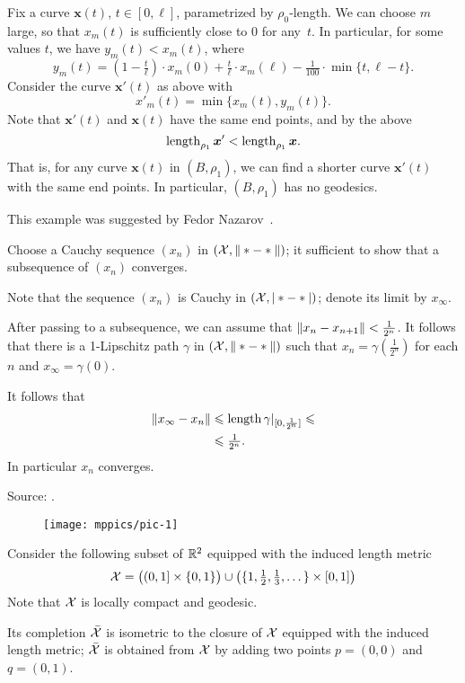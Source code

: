 Fix a curve $\bm{x}(t)$, $t\in[0,\ell]$, parametrized by  $\rho_0$-length.
We can choose $m$ large, so that $x_m(t)$ is sufficiently close to $0$ for any~$t$.
In particular, for some values $t$, we have $y_m(t)<x_m(t)$, where
\[y_m(t)=(1-\tfrac t\ell)\cdot x_m(0)
+\tfrac t\ell\cdot x_m(\ell)
-\tfrac 1{100}\cdot \min\{t,\ell-t\}.\]
Consider the curve $\bm{x}'(t)$ as above with
\[x'_m(t)=\min\{x_m(t),y_m(t)\}.\]
Note that $\bm{x}'(t)$ and $\bm{x}(t)$ have the same end points, and by the above
\[\mathop{\rm length}\nolimits_{\rho_1}\bm{x}'<\mathop{\rm length}\nolimits_{\rho_1}\bm{x}.\]
That is, for any curve $\bm{x}(t)$ in $(B,\rho_1)$, we can find a shorter curve $\bm{x}'(t)$ with the same end points.
In particular, $(B,\rho_1)$ has no geodesics.\qeds

This example was suggested by Fedor Nazarov~\cite{nazarov}.

Choose a Cauchy sequence $(x_n)$ in $(\mathcal{X},\|*-*\|)$; it sufficient to show that a subsequence of $(x_n)$ converges.

Note that the sequence $(x_n)$ is Cauchy in $(\mathcal{X},|*-*|)$;
denote its limit by $x_\infty$.

After passing to a subsequence, we can assume that $\|x_n-x_{n+1}\|\z<\tfrac1{2^n}$.
It follows that there is a 1-Lipschitz path $\gamma$ in $(\mathcal{X},\|*-*\|)$ such that $x_n=\gamma(\tfrac1{2^n})$ for each $n$ and $x_\infty=\gamma(0)$.

It follows that
\begin{align*}
\|x_\infty-x_n\|&\leqslant \mathop{\rm length}\nolimits\gamma|_{[0,\frac1{2^n}]}\leqslant
\\
&\leqslant \tfrac1{2^n}.
\end{align*}
In particular $x_n$ converges.\qeds

Source: \cite[Lemma 2.3]{petrunin-stadler}.


\begin{wrapfigure}{o}{20 mm}
\vskip-0mm
\centering
\texttt{[image: mppics/pic-1]}
\end{wrapfigure}

Consider the following subset of $\mathbb{R}^2$ equipped with the induced length metric
\[
\mathcal{X}
=
\bigl((0,1]\times\{0,1\}\bigr)
\cup
\bigl(\{1,\tfrac12,\tfrac13,\dots\}\times[0,1]\bigr)
\]
Note that $\mathcal{X}$ is locally compact and geodesic.

Its completion $\bar{\mathcal{X}}$ is isometric to the closure of $\mathcal{X}$ equipped with the induced length metric;
$\bar{\mathcal{X}}$ is obtained from $\mathcal{X}$ by adding two points $p=(0,0)$ and $q=(0,1)$.

